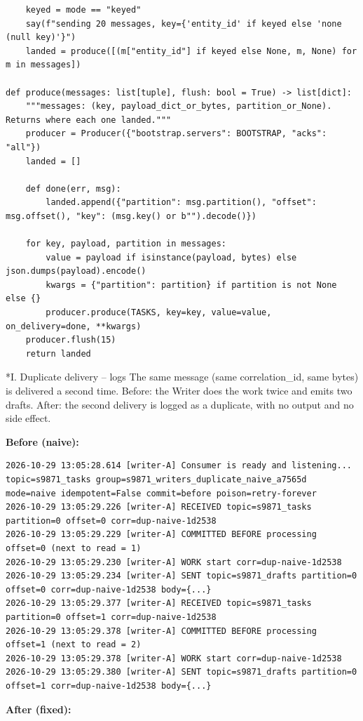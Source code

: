 \documentclass[11pt]{article}
\makeatletter
\renewcommand\subsection{\@startsection{subsection}{2}{\z@}{-2.2ex \@plus -1ex \@minus -.2ex}{0.8ex \@plus.2ex}{\normalfont\fontsize{12}{14.5}\selectfont\bfseries}}
\makeatother
\begin{document}
\begingroup\lstset{basicstyle=\ttfamily\tiny}
\begin{lstlisting}
    keyed = mode == "keyed"
    say(f"sending 20 messages, key={'entity_id' if keyed else 'none (null key)'}")
    landed = produce([(m["entity_id"] if keyed else None, m, None) for m in messages])

def produce(messages: list[tuple], flush: bool = True) -> list[dict]:
    """messages: (key, payload_dict_or_bytes, partition_or_None). Returns where each one landed."""
    producer = Producer({"bootstrap.servers": BOOTSTRAP, "acks": "all"})
    landed = []

    def done(err, msg):
        landed.append({"partition": msg.partition(), "offset": msg.offset(), "key": (msg.key() or b"").decode()})

    for key, payload, partition in messages:
        value = payload if isinstance(payload, bytes) else json.dumps(payload).encode()
        kwargs = {"partition": partition} if partition is not None else {}
        producer.produce(TASKS, key=key, value=value, on_delivery=done, **kwargs)
    producer.flush(15)
    return landed
\end{lstlisting}
\endgroup
\subsection*{I. Duplicate delivery -- logs}
The same message (same correlation\_id, same bytes) is delivered a second time. Before: the Writer does the work twice and emits two drafts. After: the second delivery is logged as a duplicate, with no output and no side effect.

\textbf{Before (naive):}

\begingroup\lstset{basicstyle=\ttfamily\tiny}
\begin{lstlisting}
2026-10-29 13:05:28.614 [writer-A] Consumer is ready and listening... topic=s9871_tasks group=s9871_writers_duplicate_naive_a7565d mode=naive idempotent=False commit=before poison=retry-forever
2026-10-29 13:05:29.226 [writer-A] RECEIVED topic=s9871_tasks partition=0 offset=0 corr=dup-naive-1d2538
2026-10-29 13:05:29.229 [writer-A] COMMITTED BEFORE processing offset=0 (next to read = 1)
2026-10-29 13:05:29.230 [writer-A] WORK start corr=dup-naive-1d2538
2026-10-29 13:05:29.234 [writer-A] SENT topic=s9871_drafts partition=0 offset=0 corr=dup-naive-1d2538 body={...}
2026-10-29 13:05:29.377 [writer-A] RECEIVED topic=s9871_tasks partition=0 offset=1 corr=dup-naive-1d2538
2026-10-29 13:05:29.378 [writer-A] COMMITTED BEFORE processing offset=1 (next to read = 2)
2026-10-29 13:05:29.378 [writer-A] WORK start corr=dup-naive-1d2538
2026-10-29 13:05:29.380 [writer-A] SENT topic=s9871_drafts partition=0 offset=1 corr=dup-naive-1d2538 body={...}
\end{lstlisting}
\endgroup
\textbf{After (fixed):}
\end{document}
